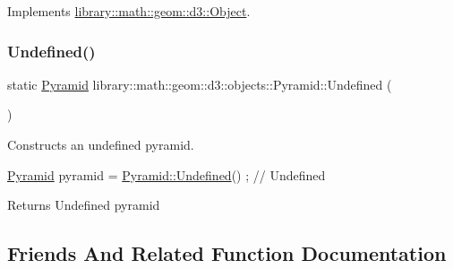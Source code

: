 Implements \hyperlink{classlibrary_1_1math_1_1geom_1_1d3_1_1_object_a989723a27a7d5f6739e45ea695a6c7ed}{library\+::math\+::geom\+::d3\+::\+Object}.

\mbox{\label{classlibrary_1_1math_1_1geom_1_1d3_1_1objects_1_1_pyramid_a254e7635e0c9f75da8502f98207e6dfe}} 
\subsubsection{\texorpdfstring{Undefined()}{Undefined()}}
{\footnotesize\ttfamily static \hyperlink{classlibrary_1_1math_1_1geom_1_1d3_1_1objects_1_1_pyramid}{Pyramid} library\+::math\+::geom\+::d3\+::objects\+::\+Pyramid\+::\+Undefined (\begin{DoxyParamCaption}{ }\end{DoxyParamCaption})\hspace{0.3cm}{\ttfamily [static]}}



Constructs an undefined pyramid. 


\begin{DoxyCode}
\hyperlink{classlibrary_1_1math_1_1geom_1_1d3_1_1objects_1_1_pyramid_aafaaeed187584040b306b7de7ee57fd4}{Pyramid} pyramid = \hyperlink{classlibrary_1_1math_1_1geom_1_1d3_1_1objects_1_1_pyramid_a254e7635e0c9f75da8502f98207e6dfe}{Pyramid::Undefined}() ; \textcolor{comment}{// Undefined}
\end{DoxyCode}


\begin{DoxyReturn}{Returns}
Undefined pyramid 
\end{DoxyReturn}


\subsection{Friends And Related Function Documentation}
\mbox{\label{classlibrary_1_1math_1_1geom_1_1d3_1_1objects_1_1_pyramid_aca232624b87596ca043f7507c27f4358}} 

